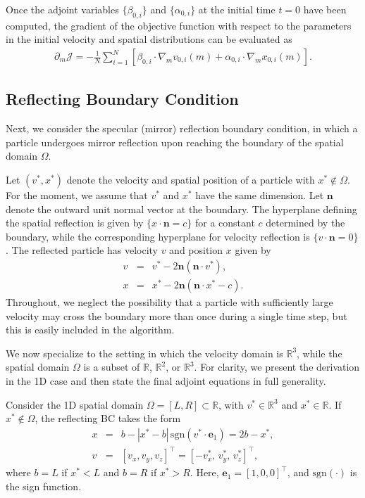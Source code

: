\documentclass[12pt,nopreprintline]{elsarticle}
\begin{document}
Once the adjoint variables $\{\beta_{0,i}\}$ and $\{\alpha_{0,i}\}$ at the initial time $t=0$ have been computed, the gradient of the objective function with respect to the parameters in the initial velocity and spatial distributions can be evaluated as{
\begin{align}\label{eq:grad_m}
\partial_{m} \mathcal J
=
-\frac{1}{N}\sum_{i=1}^N
\left[
\beta_{0,i}\cdot \nabla_{m} v_{0,i}(m)
+
\alpha_{0,i}\cdot \nabla_{m} x_{0,i}(m)
\right].
\end{align}
}

\subsection{Reflecting Boundary Condition}
\label{subsec:R}

Next, we consider the specular (mirror) reflection boundary condition, in which a particle undergoes mirror reflection upon reaching the boundary of the spatial domain $\Omega$.

Let $(v^*, x^*)$ denote the velocity and spatial position of a particle with $x^* \notin \Omega$. For the moment, we assume that $v^*$ and $x^*$ have the same dimension. Let $\mathbf n$ denote the outward unit normal vector at the boundary. The hyperplane defining the spatial reflection is given by $\{x \cdot \mathbf n = c\}$ for a constant $c$ determined by the boundary, while the corresponding hyperplane for velocity reflection is $\{v \cdot \mathbf n = 0\}$. The reflected particle has velocity $v$ and position $x$ given by
\begin{eqnarray*}
v &=& v^* - 2\mathbf n(\mathbf n \cdot v^*),\\
x &=& x^* - 2\mathbf n(\mathbf n \cdot x^* - c).
\end{eqnarray*}
Throughout, we neglect the possibility that a particle with sufficiently large velocity may cross the boundary more than once during a single time step, but this is easily included in the algorithm.

We now specialize to the setting in which the velocity domain is $\mathbb R^3$, while the spatial domain $\Omega$ is a subset of $\mathbb R$, $\mathbb R^2$, or $\mathbb R^3$. For clarity, we present the derivation in the 1D case and then state the final adjoint equations in full generality.

Consider the 1D spatial domain $\Omega = [L,R] \subset \mathbb R$, with $v^* \in \mathbb R^3$ and $x^* \in \mathbb R$. If $x^* \notin \Omega$, the reflecting BC takes the form
\begin{eqnarray*}
x &=& b - |x^* - b|\,\mathrm{sgn}(v^* \cdot \mathbf e_1) = 2b - x^*,\\
v &=& [v_x, v_y, v_z]^\top = [-v_x^*,\, v_y^*,\, v_z^*]^\top,
\end{eqnarray*}
where $b=L$ if $x^*<L$ and $b=R$ if $x^*>R$. Here, $\mathbf e_1 = [1,0,0]^\top$, and $\mathrm{sgn}(\cdot)$ is the sign function.
\end{document}
